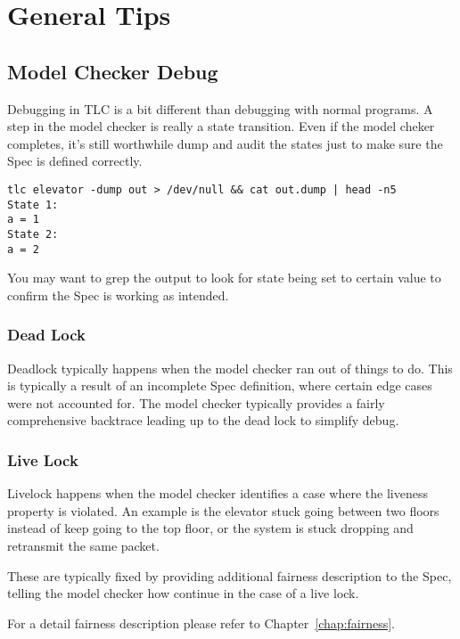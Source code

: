 \chapter{General Tips}

\section{Model Checker Debug}

Debugging in TLC is a bit different than debugging with normal programs. A step
in the model checker is really a state transition. Even if the model cheker
completes, it's still worthwhile dump and audit the states just to make sure the
Spec is defined correctly.

\begin{verbatim}
tlc elevator -dump out > /dev/null && cat out.dump | head -n5
State 1:
a = 1
State 2:
a = 2
\end{verbatim}

You may want to grep the output to look for state being set to certain value to 
confirm the Spec is working as intended.

\subsection{Dead Lock}

Deadlock typically happens when the model checker ran out of things to do. This
is typically a result of an incomplete Spec definition, where certain edge cases
were not accounted for. The model checker typically provides a fairly
comprehensive backtrace leading up to the dead lock to simplify debug.

\subsection{Live Lock}

Livelock happens when the model checker identifies a case where the liveness
property is violated. An example is the elevator stuck going between two floors 
instead of keep going to the top floor, or the system is stuck dropping and
retransmit the same packet.\newline 

These are typically fixed by providing additional fairness description to the
Spec, telling the model checker how continue in the case of a live lock.\newline 

For a detail fairness description please refer to Chapter~\ref{chap:fairness}.

